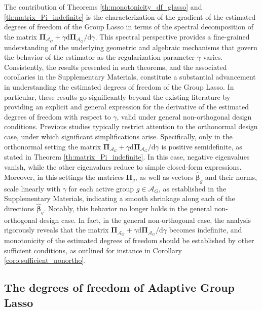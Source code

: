 \documentclass[a4paper, 12pt]{article}
\newcommand{\Aset}{\mathcal{A}}
\newcommand{\betahat}{\widehat{\boldsymbol\beta}}
\def\bPi{\boldsymbol{\Pi}}
\begin{document}
%
\noindent The contribution of Theorems \ref{th:monotonicity_df_glasso} and \ref{th:matrix_Pi_indefinite} is the characterization of the gradient of the estimated degrees of freedom of the Group Lasso in terms of the spectral decomposition of the matrix $\bPi_{\Aset_G}+\gamma\mathrm{d}\bPi_{\Aset_G}/\mathrm{d}\gamma$. This spectral perspective provides a fine-grained understanding of the underlying geometric and algebraic mechanisms that govern the behavior of the estimator as the regularization parameter $\gamma$ varies. Consistently, the results presented in such theorems, and the associated corollaries in the Supplementary Materials, constitute a substantial advancement in understanding the estimated degrees of freedom of the Group Lasso.
%
In particular, these results go significantly beyond the existing literature by providing an explicit and general expression for the derivative of the estimated degrees of freedom with respect to $\gamma$, valid under general non-orthogonal design conditions. Previous studies typically restrict attention to the orthonormal design case, under which significant simplifications arise. Specifically, only in the orthonormal setting the matrix $\bPi_{\Aset_G}+\gamma\mathrm{d}\bPi_{\Aset_G}/\mathrm{d}\gamma$ is positive semidefinite, as stated in Theorem \ref{th:matrix_Pi_indefinite}. In this case, negative eigenvalues vanish, while the other eigenvalues reduce to simple closed-form expressions. Moreover, in this settings the matrices $\bPi_g$, as well as vectors $\betahat_g$ and their norms, scale linearly with $\gamma$ for each active group $g \in \Aset_G$, as established %
in the Supplementary Materials, indicating a smooth shrinkage along each of the directions $\betahat_g$. Notably, this behavior no longer holds in the general non-orthogonal design case.
%
In fact, in the general non-orthogonal case, the analysis rigorously reveals that the matrix $\bPi_{\Aset_G}+\gamma\mathrm{d}\bPi_{\Aset_G}/\mathrm{d}\gamma$ becomes indefinite, and monotonicity of the estimated degrees of freedom should be established by other sufficient conditions, as outlined for instance in Corollary \ref{coro:sufficient_nonortho}. 
%
\subsection{The degrees of freedom of Adaptive Group Lasso}
\label{sec:glasso_adaptive_weights}
\end{document}
